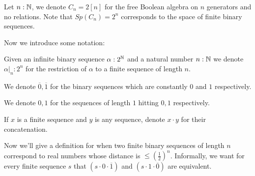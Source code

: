 \begin{example}
  Let $n:\mathbb{N}$, we denote $C_n = 2[n]$ for the free Boolean algebra on $n$ generators 
  and no relations. 
  Note that $Sp(C_n) = 2^n$ corresponds to the space of finite binary sequences. 
\end{example}
Now we introduce some notation:
\begin{definition}
  \item Given an infinite binary sequence $\alpha:2^{\mathbb{N}}$ and a natural number $n : \mathbb{N}$  
    we denote $\alpha|_n: 2^n$ for the 
    restriction of $\alpha$ to a finite sequence of length $n$. 
  \item We denote $\overline 0, \overline 1$ 
    for the binary sequences which are constantly $0$ and $1$ respectively. 
  \item We denote $0,1$ for the sequences of length $1$ hitting $0,1$ respectively. 
  \item If $x$ is a finite sequence and $y$ is any sequence, 
    denote $x\cdot y$ for their concatenation. 
\end{definition} 
Now we'll give a definition for when two finite binary sequences of length $n$ correspond 
to real numbers whose distance is $\leq (\frac12)^n$.
Informally, we want for every finite sequence $s$ that 
$(s \cdot 0 \cdot \overline 1)$ and  $(s \cdot 1 \cdot \overline 0)$ are equivalent. 

